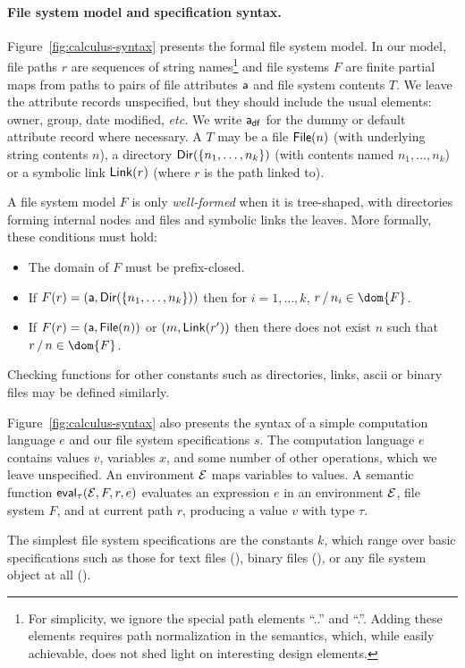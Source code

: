 \paragraph*{File system model and specification syntax.}
Figure~\ref{fig:calculus-syntax} presents the formal file system model.  
In our model, file paths $r$ are
sequences of string names\footnote{For simplicity, we ignore the special path
elements ``..'' and ``.''.  Adding these elements
requires path normalization in the semantics, which, while easily
achievable, does not shed light on interesting design elements.} 
and file systems $F$
are finite partial maps from paths to pairs of file attributes $\mathsf{a}$
and file system contents $T$.  We leave the attribute records
unspecified, but they should include the usual elements: owner, group,
date modified, {\it etc.}  We write $\mathsf{a}_{\mathsf{df}}$ for the dummy or
default attribute record where necessary.
A $T$ may be a file $\mathsf{File}(n)$ (with underlying string contents $n$),
a directory $\mathsf{Dir}( \{ n_1,\dots,n_k \} )$ (with contents named 
$n_1, \ldots, n_k$) or a symbolic link $\mathsf{Link}(r)$ (where $r$ is the
path linked to).  

A file system model $F$ is only {\em well-formed} when it is tree-shaped,
with directories forming internal nodes and files and symbolic
links the leaves.  More formally, these conditions must hold:
\begin{itemize}
\item The domain of $F$ must be prefix-closed.
\item If $F(r) = (\mathsf{a},\mathsf{Dir}( \{ n_1,\dots,n_k \} ))$ then for $i=1,\ldots,k$,
$\PCons{r}{n_i} \in \dom{F}$.
\item  If $F(r) = (\mathsf{a},\mathsf{File}(n))$ or $(m,\mathsf{Link}(r'))$ then 
there does not exist $n$ such that $\PCons{r}{n} \in \dom{F}$.
\end{itemize}
Checking functions for other constants such as directories, links,
ascii or binary files may be defined similarly.

Figure~\ref{fig:calculus-syntax} also presents the syntax of
a simple computation language $e$ and our
file system specifications $s$.  The computation language $e$
contains values $v$, variables $x$, and some number of other
operations, which we leave unspecified.  An environment
$\mathcal{E}$ maps variables to values.  A semantic function
$\mathsf{eval}_{\tau}(\mathcal{E},F,r,e)$ evaluates an expression $e$ in an
environment $\mathcal{E}$, file system $F$, and at current path $r$,
producing a value $v$ with type $\tau$.

The simplest file system specifications are the constants
$k$, which range over basic specifications such as those for
text files (\ptext), binary files (\pbin), or any
file system object at all (\pany). 

